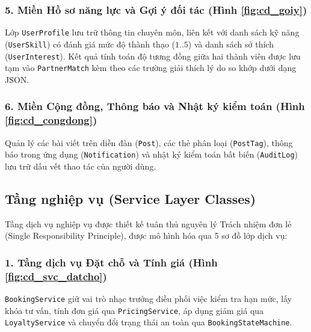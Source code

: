 
\subsubsection{5. Miền Hồ sơ năng lực và Gợi ý đối tác (Hình \ref{fig:cd_goiy})}
Lớp \texttt{UserProfile} lưu trữ thông tin chuyên môn, liên kết với danh sách kỹ năng (\texttt{UserSkill}) có đánh giá mức độ thành thạo ($1..5$) và danh sách sở thích (\texttt{UserInterest}). Kết quả tính toán độ tương đồng giữa hai thành viên được lưu tạm vào \texttt{PartnerMatch} kèm theo các trường giải thích lý do so khớp dưới dạng JSON.


\subsubsection{6. Miền Cộng đồng, Thông báo và Nhật ký kiểm toán (Hình \ref{fig:cd_congdong})}
Quản lý các bài viết trên diễn đàn (\texttt{Post}), các thẻ phân loại (\texttt{PostTag}), thông báo trong ứng dụng (\texttt{Notification}) và nhật ký kiểm toán bất biến (\texttt{AuditLog}) lưu trữ dấu vết thao tác của người dùng.


\subsection{Tầng nghiệp vụ (Service Layer Classes)}
\label{ssec:lop_dichvu}

Tầng dịch vụ nghiệp vụ được thiết kế tuân thủ nguyên lý Trách nhiệm đơn lẻ (Single Responsibility Principle), được mô hình hóa qua 5 sơ đồ lớp dịch vụ:

\subsubsection{1. Tầng dịch vụ Đặt chỗ và Tính giá (Hình \ref{fig:cd_svc_datcho})}
\texttt{BookingService} giữ vai trò nhạc trưởng điều phối việc kiểm tra hạn mức, lấy khóa tư vấn, tính đơn giá qua \texttt{PricingService}, áp dụng giảm giá qua \texttt{LoyaltyService} và chuyển đổi trạng thái an toàn qua \texttt{BookingStateMachine}.

